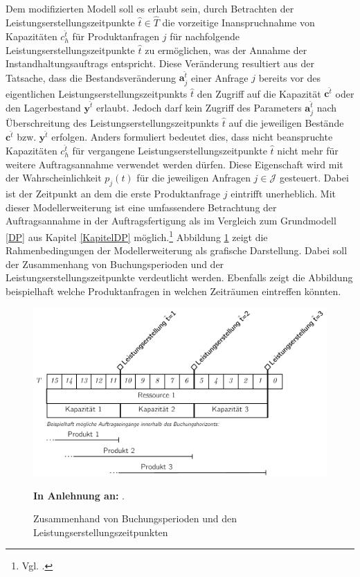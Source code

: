 Dem modifizierten Modell soll es erlaubt sein, durch Betrachten der Leistungserstellungszeitpunkte $\hat t \in \hat T$ die vorzeitige Inanspruchnahme von Kapazitäten $c_{h}^{\hat t}$ für Produktanfragen $j$ für nachfolgende Leistungserstellungszeitpunkte $\hat{t}$ zu ermöglichen, was der Annahme der Instandhaltungsauftrags entspricht. Diese Veränderung resultiert aus der Tatsache, dass die Bestandsveränderung $\textbf{a}_j^{\hat t}$ einer Anfrage $j$ bereits vor des eigentlichen Leistungserstellungszeitpunkts $\hat t$ den Zugriff auf die Kapazität $\textbf{c}^{\hat t}$ oder den Lagerbestand $\textbf{y}^{\hat t}$ erlaubt. Jedoch darf kein Zugriff des Parameters $\textbf{a}_j^{\hat t}$ nach Überschreitung des Leistungserstellungszeitpunkts $\hat t$ auf die jeweiligen Bestände $\textbf{c}^{\hat t}$ bzw. $\textbf{y}^{\hat t}$ erfolgen. Anders formuliert bedeutet dies, dass nicht beanspruchte Kapazitäten $c_{h}^{\hat t}$ für vergangene Leistungserstellungszeitpunkte $\hat t$ nicht mehr für weitere Auftragsannahme verwendet werden dürfen. Diese Eigenschaft wird mit der Wahrscheinlichkeit $p_j(t)$ für die jeweiligen Anfragen $j\in\mathcal{J}$ gesteuert. Dabei ist der Zeitpunkt an dem die erste Produktanfrage $j$ eintrifft unerheblich. Mit dieser Modellerweiterung ist eine umfassendere Betrachtung der Auftragsannahme in der Auftragsfertigung als im Vergleich zum Grundmodell \ref{DP} aus Kapitel \ref{KapitelDP} möglich.\footnote{Vgl. \cite{lars}.} Abbildung \ref{LP2} zeigt die Rahmenbedingungen der Modellerweiterung als grafische Darstellung. Dabei soll der Zusammenhang von Buchungsperioden und der Leistungserstellungszeitpunkte verdeutlicht werden. Ebenfalls zeigt die Abbildung beispielhaft welche Produktanfragen in welchen Zeiträumen eintreffen könnten.

\begin{figure}[h!]
  \begin{center}
    \includegraphics[width=130mm]{Bilder/Leistungsperioden2.pdf}
    \caption{Zusammenhand von Buchungsperioden und den Leistungserstellungszeitpunkten}  \label{LP2}
    {\footnotesize \textbf{In Anlehnung an:} \cite{lars}}. 
  \end{center}
\end{figure}



